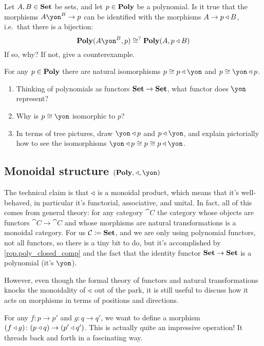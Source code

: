 \documentclass[DynamicalBook]{subfiles}
\begin{document}
\begin{exercise}
Let $A,B\in\textbf{Set}$ be sets, and let $p\in\textbf{Poly}$ be a polynomial. Is it true that the morphisms $A\yon^B\to p$ can be identified with the morphisms $A\to p\mathbin{\triangleleft} B$, i.e.\ that there is a bijection:
\begin{equation}\label{eqn.monomials_and_comp}
	\poly(A\yon^B,p)\cong^?\poly(A,p\tri B)
\end{equation}
If so, why? If not, give a counterexample.
\end{exercise}

\begin{exercise}\label{ex.compose_yon}
For any $p\in\textbf{Poly}$ there are natural isomorphisms $p\cong p\tri \yon$ and $p\cong\yon\tri p$.
\begin{enumerate}
	\item Thinking of polynomials as functors $\textbf{Set}\to\textbf{Set}$, what functor does $\yon$ represent?
	\item Why is $p\cong\yon$ isomorphic to $p$?
	\item In terms of tree pictures, draw $\yon\tri p$ and $p\tri\yon$, and explain pictorially how to see the isomorphisms $\yon\tri p\cong p\cong p\tri\yon$.
\qedhere
\end{enumerate}
\end{exercise}

\subsection{Monoidal structure $(\poly,\tri,\yon)$}

The technical claim is that $\mathbin{\triangleleft}$ is a monoidal product, which means that it's well-behaved, in particular it's functorial, associative, and unital. In fact, all of this comes from general theory: for any category $\cat{C}$ the category whose objects are functors $\cat{C}\to\cat{C}$ and whose morphisms are natural transformations is a monoidal category. For us $\mathcal{C}\coloneqq\textbf{Set}$, and we are only using polynomial functors, not all functors, so there is a tiny bit to do, but it's accomplished by \cref{rop.poly_closed_comp} and the fact that the identity functor $\textbf{Set}\to\textbf{Set}$ is a polynomial (it's $\yon$).

However, even though the formal theory of functors and natural transformations knocks the monoidality of $\mathbin{\triangleleft}$ out of the park, it is still useful to discuss how it acts on morphisms in terms of positions and directions.

For any $f\colon p\to p'$ and $g\colon q\to q'$, we want to define a morphism $(f\mathbin{\triangleleft} g)\colon(p\mathbin{\triangleleft} q)\to(p'\mathbin{\triangleleft} q')$. This is actually quite an impressive operation! It threads back and forth in a fascinating way. 
\end{document}
